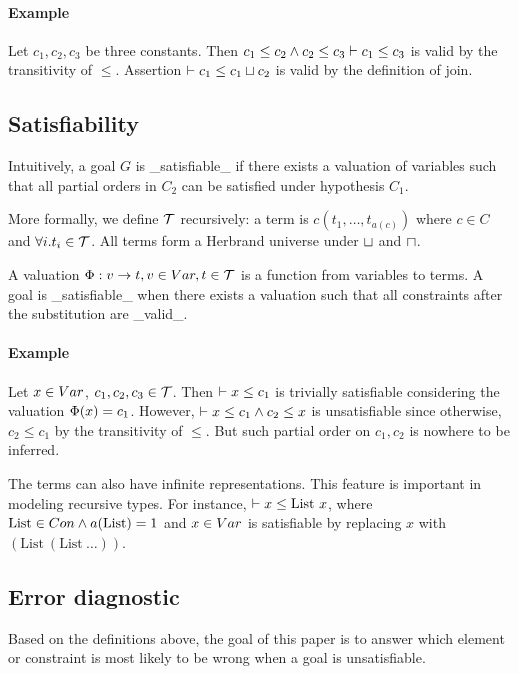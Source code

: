 \paragraph{Example}

Let $c_1, c_2, c_3$ be three constants. Then $c_1 \leq c_2 \land c_2 \leq c_3
\vdash c_1 \leq c_3$ is valid by the transitivity of $\leq$. Assertion $
\vdash c_1 \leq c_1 \sqcup c_2$ is valid by the definition of join. 

\subsection{Satisfiability}

Intuitively, a goal $G$ is _satisfiable_ if there exists a valuation of
variables such that all partial orders in $C_2$ can be satisfied under
hypothesis $C_1$.

More formally, we define $\mathcal{T}$ recursively: a term is $c(t_1,
\dots, t_{a(c)})$ where $c\in C$ and $\forall i. t_i\in \mathcal{T}$. All
terms form a Herbrand universe under $\sqcup$ and $\sqcap$.

A valuation $\Phi: v \to t, v\in Var, t\in \mathcal{T}$ is a
function from variables to terms. A goal is _satisfiable_ when there
exists a valuation such that all constraints after the substitution
are _valid_. 

\paragraph{Example}

Let $x\in Var$, $c_1, c_2, c_3\in \mathcal{T}$. Then $\vdash x \leq c_1$ is
trivially satisfiable considering the valuation $\Phi(x)=c_1$. However,
$\vdash x \leq c_1 \land c_2 \leq x$ is unsatisfiable since otherwise, $c_2
\leq c_1$ by the transitivity of $\leq$. But such partial order on $c_1, c_2$
is nowhere to be inferred.

The terms can also have infinite representations. This feature is
important in modeling recursive types. For instance, $\vdash x \leq
\text{List} \ x$, where $\text{List} \in Con \land a(\text{List})=1$ and
$x\in Var$ is satisfiable by replacing $x$ with $(\text{List} \
(\text{List} \ \dots))$.    

\subsection{Error diagnostic}

Based on the definitions above, the goal of this paper is to answer which
element or constraint is most likely to be wrong when a goal is unsatisfiable. 

